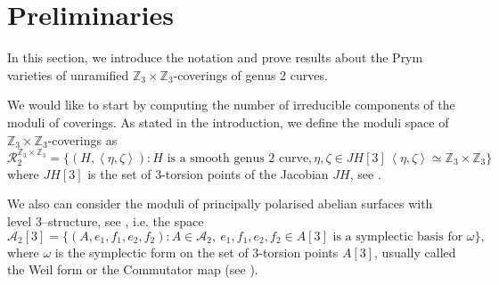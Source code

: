 \documentclass{amsart}
\theoremstyle{remark}
\numberwithin{equation}{section}
\newcommand{\ZZ}{\mathbb Z}
\newcommand{\cA}{\mathcal{A}}
\begin{document}
\section{Preliminaries}
In this section, we introduce the notation and prove results about the Prym varieties of unramified $\mathbb{Z}_3 \times \mathbb{Z}_3$-coverings of genus 2 curves.

We would like to start by computing the number of irreducible components of the moduli of coverings. As stated in the introduction, we define the moduli space of $\ZZ_3\times\ZZ_3$-coverings as 
$$\mathcal{R}_2^{\mathbb{Z}_3\times \mathbb{Z}_3}=\{(H,\left<\eta,
\zeta\right>): H \text{ is a smooth genus 2 curve}, \eta,\zeta\in JH[3]\, \left<\eta,\zeta\right>\simeq\ZZ_3\times\ZZ_3\}$$
where $JH[3]$ is the set of 3-torsion points of the Jacobian $JH$, see \cite{Pardini}.

We also can consider the moduli of principally polarised abelian surfaces with level 3--structure, see \cite[Chap 8.3.2]{BL}, i.e. the space $$\cA_2[3]=\{(A,e_1,f_1,e_2,f_2): A\in\cA_2,\ e_1,f_1,e_2,f_2\in A[3] \text{ is a symplectic basis for } \omega\},$$
where $\omega$ is the symplectic form on the set of 3-torsion points $A[3]$, usually called the Weil form or the Commutator map (see \cite[Chap 6.3]{BL}).
\end{document}
